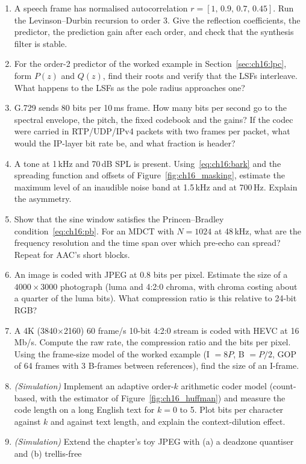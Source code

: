 \begin{enumerate}[label=\thechapter.\arabic*]
\item A speech frame has normalised autocorrelation $r=[1,\,0.9,\,0.7,\,0.45]$. Run the Levinson--Durbin
recursion to order 3. Give the reflection coefficients, the predictor, the prediction gain after each order,
and check that the synthesis filter is stable.
\item For the order-2 predictor of the worked example in Section~\ref{sec:ch16:lpc}, form $P(z)$ and $Q(z)$,
find their roots and verify that the LSFs interleave. What happens to the LSFs as the pole radius
approaches one?
\item G.729 sends 80 bits per 10\,ms frame. How many bits per second go to the spectral envelope, the pitch,
the fixed codebook and the gains? If the codec were carried in RTP/UDP/IPv4 packets with two frames per packet,
what would the IP-layer bit rate be, and what fraction is header?
\item A tone at 1\,kHz and 70\,dB SPL is present. Using~\eqref{eq:ch16:bark} and the spreading function and
offsets of Figure~\ref{fig:ch16_masking}, estimate the maximum level of an inaudible noise band at 1.5\,kHz
and at 700\,Hz. Explain the asymmetry.
\item Show that the sine window satisfies the Princen--Bradley condition~\eqref{eq:ch16:pb}. For an MDCT with
$N=1024$ at 48\,kHz, what are the frequency resolution and the time span over which pre-echo can spread? Repeat
for AAC's short blocks.
\item An image is coded with JPEG at 0.8 bits per pixel. Estimate the size of a $4000\times3000$ photograph
(luma and 4:2:0 chroma, with chroma costing about a quarter of the luma bits). What compression ratio is this
relative to 24-bit RGB?
\item A 4K (3840$\times$2160) 60 frame/s 10-bit 4:2:0 stream is coded with HEVC at 16\,Mb/s. Compute the raw rate,
the compression ratio and the bits per pixel. Using the frame-size model of the worked example (I $=8P$,
B $=P/2$, GOP of 64 frames with 3 B-frames between references), find the size of an I-frame.
\item \emph{(Simulation)} Implement an adaptive order-$k$ arithmetic coder model (count-based, with the
estimator of Figure~\ref{fig:ch16_huffman}) and measure the code length on a long English text for $k=0$ to 5.
Plot bits per character against $k$ and against text length, and explain the context-dilution effect.
\item \emph{(Simulation)} Extend the chapter's toy JPEG with (a) a deadzone quantiser and (b) trellis-free

\end{enumerate}
